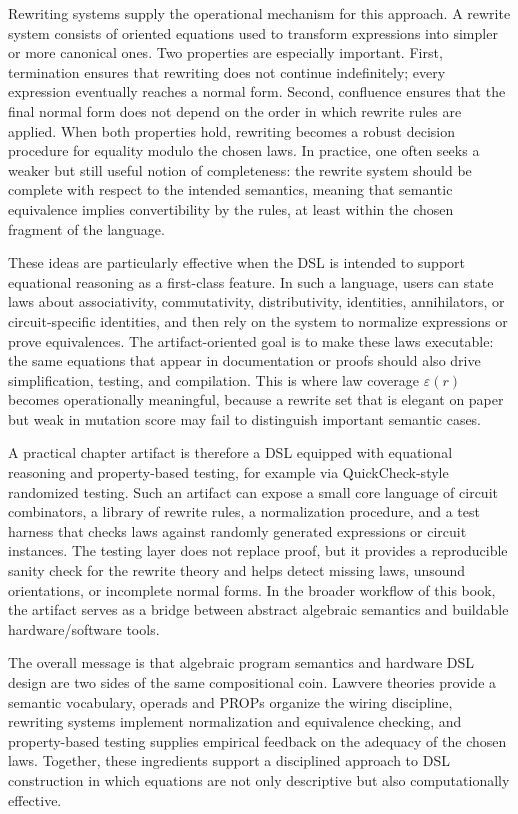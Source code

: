 \documentclass[11pt]{article}
\begin{document}
Rewriting systems supply the operational mechanism for this approach. A rewrite system consists of oriented equations used to transform expressions into simpler or more canonical ones. Two properties are especially important. First, termination ensures that rewriting does not continue indefinitely; every expression eventually reaches a normal form. Second, confluence ensures that the final normal form does not depend on the order in which rewrite rules are applied. When both properties hold, rewriting becomes a robust decision procedure for equality modulo the chosen laws. In practice, one often seeks a weaker but still useful notion of completeness: the rewrite system should be complete with respect to the intended semantics, meaning that semantic equivalence implies convertibility by the rules, at least within the chosen fragment of the language.

These ideas are particularly effective when the DSL is intended to support equational reasoning as a first-class feature. In such a language, users can state laws about associativity, commutativity, distributivity, identities, annihilators, or circuit-specific identities, and then rely on the system to normalize expressions or prove equivalences. The artifact-oriented goal is to make these laws executable: the same equations that appear in documentation or proofs should also drive simplification, testing, and compilation. This is where law coverage \(\varepsilon(r)\) becomes operationally meaningful, because a rewrite set that is elegant on paper but weak in mutation score may fail to distinguish important semantic cases.

A practical chapter artifact is therefore a DSL equipped with equational reasoning and property-based testing, for example via QuickCheck-style randomized testing. Such an artifact can expose a small core language of circuit combinators, a library of rewrite rules, a normalization procedure, and a test harness that checks laws against randomly generated expressions or circuit instances. The testing layer does not replace proof, but it provides a reproducible sanity check for the rewrite theory and helps detect missing laws, unsound orientations, or incomplete normal forms. In the broader workflow of this book, the artifact serves as a bridge between abstract algebraic semantics and buildable hardware/software tools.

The overall message is that algebraic program semantics and hardware DSL design are two sides of the same compositional coin. Lawvere theories provide a semantic vocabulary, operads and PROPs organize the wiring discipline, rewriting systems implement normalization and equivalence checking, and property-based testing supplies empirical feedback on the adequacy of the chosen laws. Together, these ingredients support a disciplined approach to DSL construction in which equations are not only descriptive but also computationally effective.
\end{document}
